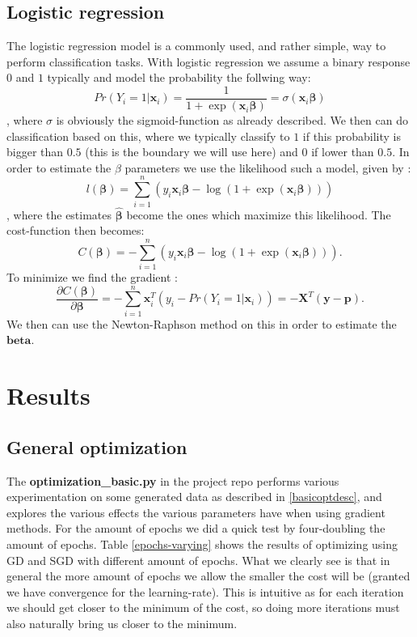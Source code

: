 \documentclass{article}
\begin{document}
\subsection{Logistic regression}
The logistic regression model is a commonly used, and rather simple, way to
perform classification tasks. With logistic regression we assume a binary
response $0$ and $1$ typically and model the probability the follwing way:
$$Pr(Y_i = 1 | \bm{x}_i) = \frac{1}{1 + \exp(\bm{x}_i \bm{\beta})} = \sigma(\bm{x}_i \bm{\beta})$$
, where $\sigma$ is obviously the sigmoid-function as already described. We then
can do classification based on this, where we typically classify to $1$ if this
probability is bigger than $0.5$ (this is the boundary we will use here) and $0$
if lower than $0.5$. In order to estimate the $\beta$ parameters we use the
likelihood such a model, given by \cite[s.~4.4]{hastie2009elements}:
$$l(\bm{\beta}) = \sum_{i=1}^{n} (y_i \bm{x}_i \bm{\beta} - \log(1 + \exp(\bm{x}_i \bm{\beta})))$$
, where the estimates $\hat{\bm{\beta}}$ become the ones which maximize this
likelihood. The cost-function then becomes:
$$C(\bm{\beta}) = -\sum_{i=1}^{n} (y_i \bm{x}_i \bm{\beta} - \log(1 + \exp(\bm{x}_i \bm{\beta}))).$$
To minimize we find the gradient \cite[s.~4.4]{hastie2009elements}:
$$\frac{\partial C(\bm{\beta})}{\partial \bm{\beta}} = -\sum_{i=1}^{n}\bm{x}_i^T(y_i - Pr(Y_i = 1 | \bm{x}_i)) = -\bm{X}^T(\bm{y} - \bm{p}).$$
We then can use the Newton-Raphson method on this in order to estimate the $\bm{beta}$.

\section{Results}

\subsection{General optimization}
The \textbf{optimization\_basic.py} in the project repo
\cite{githubrepoproject2code} performs various experimentation on some generated
data as described in \ref{basicoptdesc}, and explores the various effects the
various parameters have when using gradient methods. For the amount of epochs we
did a quick test by four-doubling the amount of epochs. Table
\ref{epochs-varying} shows the results of optimizing using GD and SGD with
different amount of epochs. What we clearly see is that in general the more
amount of epochs we allow the smaller the cost will be (granted we have
convergence for the learning-rate). This is intuitive as for each iteration we
should get closer to the minimum of the cost, so doing more iterations must also
naturally bring us closer to the minimum.
\end{document}
